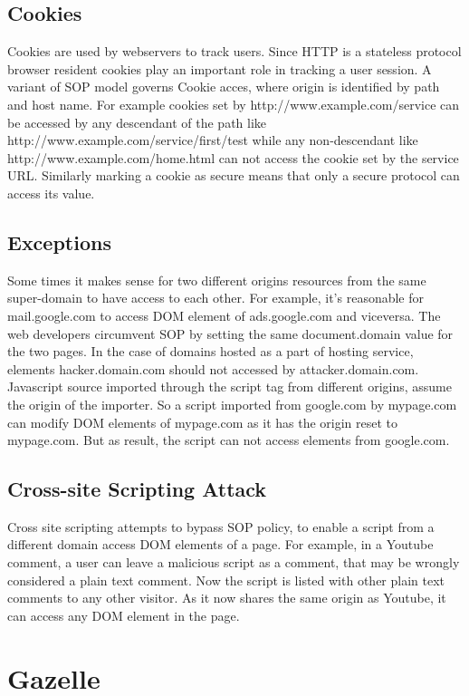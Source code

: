 \documentclass[11pt]{article} %
\begin{document}
\subsection {Cookies}
Cookies are used by webservers to track users. Since HTTP is a stateless protocol
browser resident cookies play an important role in tracking a user session. A
variant of SOP model governs Cookie acces, where origin is identified by path and
host name. For example cookies set by http://www.example.com/service can be accessed
by any descendant of the path like http://www.example.com/service/first/test
while any non-descendant like http://www.example.com/home.html can not access the
cookie set by the service URL. Similarly marking a cookie as secure means that
only a secure protocol can access its value.

\subsection {Exceptions}
Some times it makes sense for two different origins resources from the same 
super-domain to have access to each other. For example, it's reasonable for
mail.google.com to access DOM element of ads.google.com and viceversa. The
web developers circumvent SOP by setting the same document.domain value for
the two pages. In the case of domains hosted as a part of hosting service,
elements hacker.domain.com should not accessed by attacker.domain.com.\\

Javascript source imported through the script tag from different origins,
assume the origin of the importer. So a script imported from google.com
by mypage.com can modify DOM elements of mypage.com as it has the origin
reset to mypage.com. But as result, the script can not access elements from 
google.com.

\subsection {Cross-site Scripting Attack}
Cross site scripting attempts to bypass SOP policy, to enable a script from a
different domain access DOM elements of a page. For example, in a Youtube comment,
a user can leave a malicious script as a comment, that may be wrongly considered
a plain text comment. Now the script is listed with other plain text comments to
any other visitor. As it now shares the same origin as Youtube, it can access any
DOM element in the page.

\section {Gazelle}
\end{document}

